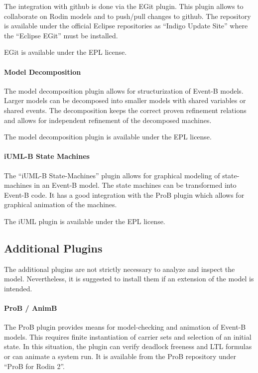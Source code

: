 \documentclass[10pt,a4paper]{article}
\begin{document}
The integration with github is done via the EGit plugin. This plugin allows to
collaborate on Rodin models and to push/pull changes to github. The repository
is available under the official Eclipse repositories as ``Indigo Update Site''
where the ``Eclipse EGit'' must be installed.

EGit is available under the EPL license.

\paragraph{Model Decomposition}
\label{sec:model-decomposition}

The model decomposition plugin allows for structurization of Event-B
models. Larger models can be decomposed into smaller models with shared
variables or shared events. The decomposition keeps the correct proven
refinement relations and allows for independent refinement of the decomposed
machines. 

The model decomposition plugin is available under the EPL license.

\paragraph{iUML-B State Machines}
\label{sec:iuml-b-state}

The ``iUML-B State-Machines'' plugin allows for graphical modeling of
state-machines in an Event-B model. The state machines can be transformed into
Event-B code. It has a good integration with the ProB plugin which allows for
graphical animation of the machines.

The iUML plugin is available under the EPL license.

\subsection{Additional Plugins}
\label{sec:additional-plugins}

The additional plugins are not strictly necessary to analyze and inspect the
model. Nevertheless, it is suggested to install them if an extension of the
model is intended.

\paragraph{ProB / AnimB}
\label{sec:prob}

The ProB plugin provides means for model-checking and animation of Event-B
models. This requires finite instantiation of carrier sets and selection of an
initial state. In this situation, the plugin can verify deadlock freeness and
LTL formulas or can animate a system run. It is available from the ProB
repository under ``ProB for Rodin 2''.
\end{document}
